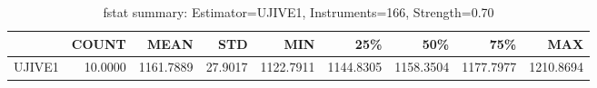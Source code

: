 \begin{table}[ht]
\centering
\caption{fstat summary: Estimator=UJIVE1, Instruments=166, Strength=0.70}
\begin{tabular}{lrrrrrrrr}
\toprule
 & COUNT & MEAN & STD & MIN & 25\% & 50\% & 75\% & MAX \\
\midrule
UJIVE1 & 10.0000 & 1161.7889 & 27.9017 & 1122.7911 & 1144.8305 & 1158.3504 & 1177.7977 & 1210.8694 \\
\bottomrule
\end{tabular}
\end{table}
